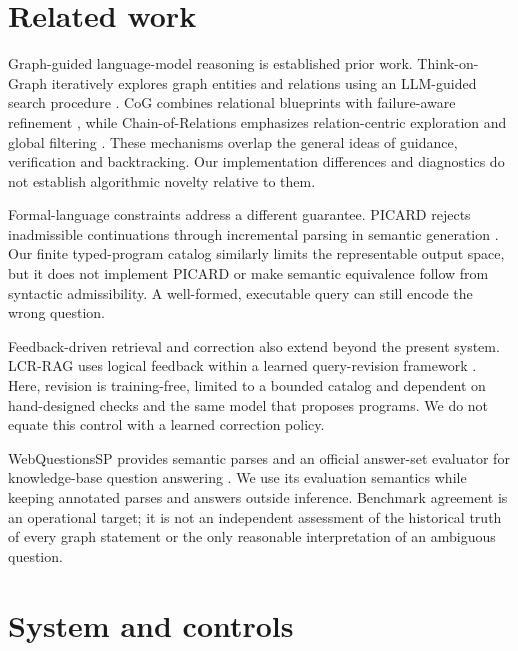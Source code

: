 \documentclass[10pt]{article}
\begin{document}
\section{Related work}

Graph-guided language-model reasoning is established prior work. Think-on-Graph iteratively explores graph entities and relations using an LLM-guided search procedure \cite{sun2024tog}. CoG combines relational blueprints with failure-aware refinement \cite{liu-etal-2026-cog}, while Chain-of-Relations emphasizes relation-centric exploration and global filtering \cite{liu-etal-2026-chain}. These mechanisms overlap the general ideas of guidance, verification and backtracking. Our implementation differences and diagnostics do not establish algorithmic novelty relative to them.\par

Formal-language constraints address a different guarantee. PICARD rejects inadmissible continuations through incremental parsing in semantic generation \cite{scholak-etal-2021-picard}. Our finite typed-program catalog similarly limits the representable output space, but it does not implement PICARD or make semantic equivalence follow from syntactic admissibility. A well-formed, executable query can still encode the wrong question.\par

Feedback-driven retrieval and correction also extend beyond the present system. LCR-RAG uses logical feedback within a learned query-revision framework \cite{zheng-etal-2026-lcr}. Here, revision is training-free, limited to a bounded catalog and dependent on hand-designed checks and the same model that proposes programs. We do not equate this control with a learned correction policy.\par

WebQuestionsSP provides semantic parses and an official answer-set evaluator for knowledge-base question answering \cite{yih-etal-2016-value}. We use its evaluation semantics while keeping annotated parses and answers outside inference. Benchmark agreement is an operational target; it is not an independent assessment of the historical truth of every graph statement or the only reasonable interpretation of an ambiguous question.\par

\section{System and controls}
\end{document}
